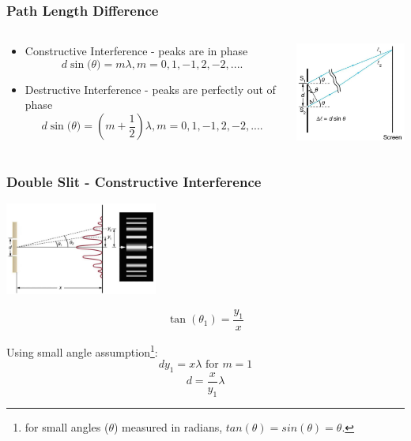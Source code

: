 \documentclass{beamer}
\begin{document}
\begin{frame}\frametitle{Path Length Difference}
\begin{columns}
\begin{column}{7cm}
\begin{itemize}
\item Constructive Interference - peaks are in phase
\[d \sin{(\theta}) = m \lambda, m = 0,1,-1,2,-2,....\]
\item Destructive Interference - peaks are perfectly out of phase
\[d \sin{(\theta}) = (m+\frac{1}{2})  \lambda, m = 0,1,-1,2,-2,....\]
\end{itemize}
\end{column}
\begin{column}{4cm}
\begin{center}
\includegraphics[width=4cm]{fig/ds3.jpg}
\end{center}
\end{column}
\end{columns}
\end{frame}

\begin{frame}\frametitle{Double Slit - Constructive Interference}
\begin{center}
\includegraphics[width=5cm]{fig/ds4.jpg}
\end{center}
\[ \tan{(\theta_1)} = \frac{y_1}{x} \]

Using small angle assumption\footnote{for small angles ($\theta$) measured in radians, $tan(\theta) = sin(\theta) = \theta$.}:
\[d y_1 = x \lambda \text{ for } m=1\]
\[d = \frac{x}{y_1} \lambda \]

\end{frame}
\end{document}

